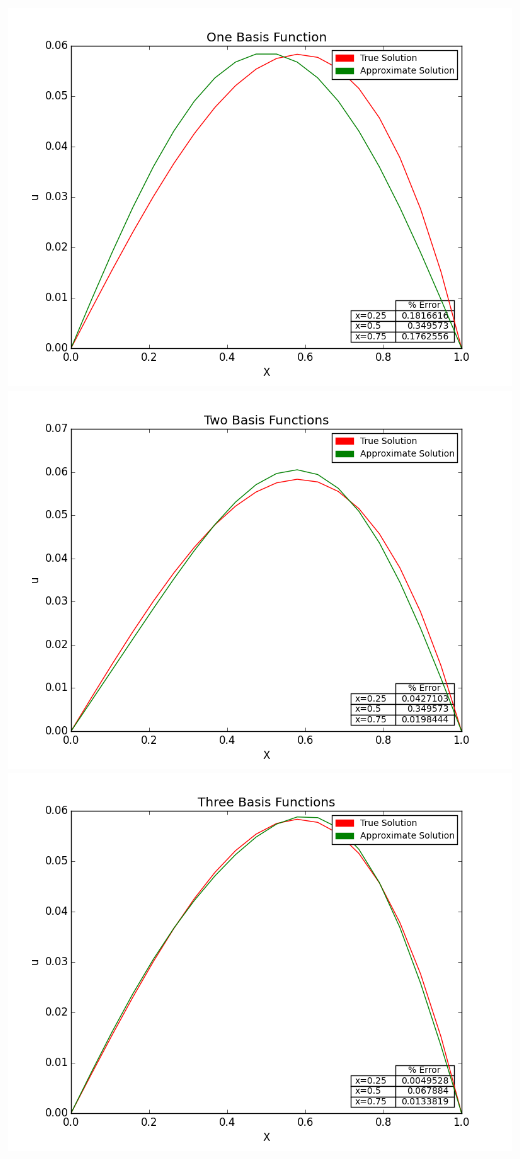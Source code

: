 \documentclass[10pt]{article}
\begin{document}
\begin{center}
\includegraphics[scale=0.4]{one.png}\includegraphics[scale=0.4]{two.png}
\includegraphics[scale=0.4]{three.png}
\end{center}
\end{document}
